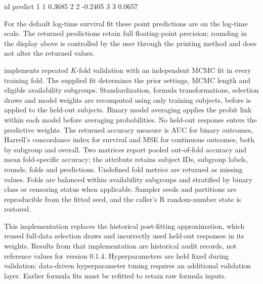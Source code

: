 \documentclass[article]{jss}
\begin{document}
\begin{CodeChunk}
\begin{CodeOutput}
  id predict
1  1  0.3685
2  2 -0.2405
3  3  0.0657
\end{CodeOutput}
\end{CodeChunk}

For the default log-time survival fit these point predictions are on the log-time
scale. The returned predictions retain full floating-point precision; rounding in the
display above is controlled by the user through the printing method and does
not alter the returned values.

 implements repeated $K$-fold validation with an independent
MCMC fit in every training fold. The supplied fit determines the prior settings,
MCMC length and eligible availability subgroups. Standardization, formula
transformations, selection draws and model weights are recomputed using only
training subjects, before  is applied to the held-out subjects.
Binary model averaging applies the probit link within each model before
averaging probabilities. No held-out response enters the predictive weights.
The returned accuracy measure is AUC for binary outcomes, Harrell's concordance
index for survival and MSE for continuous outcomes, both by subgroup and overall.
Two matrices report pooled out-of-fold accuracy and mean fold-specific accuracy;
the  attribute retains subject IDs, subgroup labels, rounds,
folds and predictions. Undefined fold metrics are returned as missing values.
Folds are balanced within availability subgroups and stratified by binary class
or censoring status when applicable. Sampler seeds and partitions are reproducible
from the fitted seed, and the caller's R random-number state is restored.

This implementation replaces the historical post-fitting approximation, which
reused full-data selection draws and incorrectly used held-out responses in
its weights. Results from that implementation are historical audit records,
not reference values for version 0.1.4. Hyperparameters are held fixed during
validation; data-driven hyperparameter tuning requires an additional validation
layer. Earlier formula fits must be refitted to retain raw formula inputs.
\end{document}

